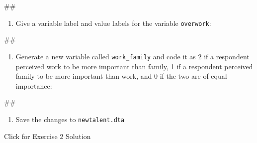 \documentclass[
]{book}
\newenvironment{Shaded}{\begin{snugshade}}{\end{snugshade}}
\newcommand{\NormalTok}[1]{#1}
\providecommand{\tightlist}{%
  \setlength{\itemsep}{0pt}\setlength{\parskip}{0pt}}
\begin{document}
\begin{Shaded}
\begin{Highlighting}[]
\NormalTok{\#\#}
\end{Highlighting}
\end{Shaded}

\begin{enumerate}
\def\labelenumi{\arabic{enumi}.}
\setcounter{enumi}{5}
\tightlist
\item
  Give a variable label and value labels for the variable \texttt{overwork}:
\end{enumerate}

\begin{Shaded}
\begin{Highlighting}[]
\NormalTok{\#\#}
\end{Highlighting}
\end{Shaded}

\begin{enumerate}
\def\labelenumi{\arabic{enumi}.}
\setcounter{enumi}{6}
\tightlist
\item
  Generate a new variable called \texttt{work\_family} and code it as 2 if a respondent perceived work to be more important than family, 1 if a respondent perceived family to be more important than work, and 0 if the two are of equal importance:
\end{enumerate}

\begin{Shaded}
\begin{Highlighting}[]
\NormalTok{\#\#}
\end{Highlighting}
\end{Shaded}

\begin{enumerate}
\def\labelenumi{\arabic{enumi}.}
\setcounter{enumi}{7}
\tightlist
\item
  Save the changes to \texttt{newtalent.dta}
\end{enumerate}

{Click for Exercise 2 Solution}
\end{document}
